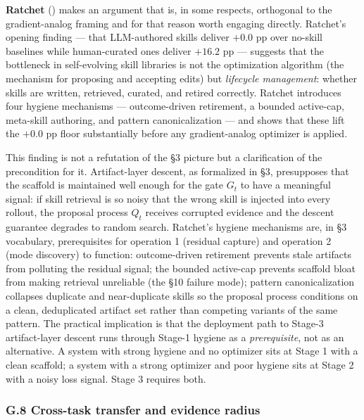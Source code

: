 \documentclass[
]{article}
\begin{document}
\textbf{Ratchet} ()
makes an argument that is, in some respects, orthogonal to the
gradient-analog framing and for that reason worth engaging directly.
Ratchet's opening finding --- that LLM-authored skills deliver \(+0.0\)
pp over no-skill baselines while human-curated ones deliver \(+16.2\) pp
--- suggests that the bottleneck in self-evolving skill libraries is not
the optimization algorithm (the mechanism for proposing and accepting
edits) but \emph{lifecycle management}: whether skills are written,
retrieved, curated, and retired correctly. Ratchet introduces four
hygiene mechanisms --- outcome-driven retirement, a bounded active-cap,
meta-skill authoring, and pattern canonicalization --- and shows that
these lift the \(+0.0\) pp floor substantially before any
gradient-analog optimizer is applied.

This finding is not a refutation of the §3 picture but a clarification
of the precondition for it. Artifact-layer descent, as formalized in §3,
presupposes that the scaffold is maintained well enough for the gate
\(G_t\) to have a meaningful signal: if skill retrieval is so noisy that
the wrong skill is injected into every rollout, the proposal process
\(Q_t\) receives corrupted evidence and the descent guarantee degrades
to random search. Ratchet's hygiene mechanisms are, in §3 vocabulary,
prerequisites for operation 1 (residual capture) and operation 2 (mode
discovery) to function: outcome-driven retirement prevents stale
artifacts from polluting the residual signal; the bounded active-cap
prevents scaffold bloat from making retrieval unreliable (the §10
failure mode); pattern canonicalization collapses duplicate and
near-duplicate skills so the proposal process conditions on a clean,
deduplicated artifact set rather than competing variants of the same
pattern. The practical implication is that the deployment path to
Stage-3 artifact-layer descent runs through Stage-1 hygiene as a
\emph{prerequisite}, not as an alternative. A system with strong hygiene
and no optimizer sits at Stage 1 with a clean scaffold; a system with a
strong optimizer and poor hygiene sits at Stage 2 with a noisy loss
signal. Stage 3 requires both.

\subsubsection{G.8 Cross-task transfer and evidence
radius}\label{g.8-cross-task-transfer-and-evidence-radius}
\end{document}
